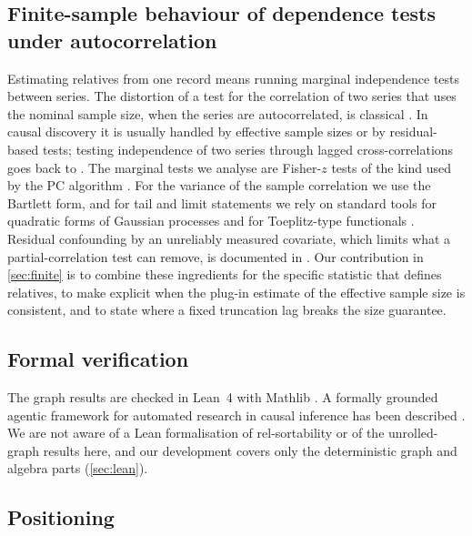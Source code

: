 \documentclass[pdflatex,sn-apa]{sn-jnl}
\theoremstyle{thmstyleone}
\theoremstyle{thmstylethree}
\theoremstyle{thmstyletwo}
\begin{document}
\subsection{Finite-sample behaviour of dependence tests under autocorrelation}
\label{sec:rw-finite}

Estimating relatives from one record means running marginal independence tests
between series. The distortion of a test for the correlation of two series that
uses the nominal sample size, when the series are autocorrelated, is classical
\citep{bartlett1935,clifford1989,roy1989}. In causal discovery it is usually
handled by effective sample sizes \citep{runge2019detecting,afyouni2019effective}
or by residual-based tests; testing independence of two series through lagged
cross-correlations goes back to \citet{haugh1976checking}. The marginal tests we
analyse are Fisher-$z$ tests of the kind used by the PC algorithm
\citep{spirtes2000causation}. For the variance of the sample correlation we use
the Bartlett form, and for tail and limit statements we rely on standard tools
for quadratic forms of Gaussian processes and for Toeplitz-type functionals
\citep{hsu2012tail,laurent2000adaptive,arcones1994limit,nourdin2011quantitative,
ginovyan2021survey}. Residual confounding by an unreliably measured covariate,
which limits what a partial-correlation test can remove, is documented in
\citet{westfall2016confounding}. Our contribution in \cref{sec:finite} is to
combine these ingredients for the specific statistic that defines relatives, to
make explicit when the plug-in estimate of the effective sample size is
consistent, and to state where a fixed truncation lag breaks the size guarantee.

\subsection{Formal verification}
\label{sec:rw-lean}

The graph results are checked in Lean~4 \citep{demoura2021lean4} with Mathlib
\citep{mathlib2020}. A formally grounded
agentic framework for automated research in causal inference has been described
\citep{tan2026causalsmith}. We are not aware of a Lean formalisation of
rel-sortability or of the unrolled-graph results here, and our development
covers only the deterministic graph and algebra parts (\cref{sec:lean}).

\subsection{Positioning}
\label{sec:rw-pos}
\end{document}
